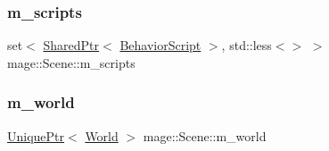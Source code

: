 \subsubsection{\texorpdfstring{m\+\_\+scripts}{m\_scripts}}
{\footnotesize\ttfamily set$<$ \hyperlink{namespacemage_a1e01ae66713838a7a67d30e44c67703e}{Shared\+Ptr}$<$ \hyperlink{classmage_1_1_behavior_script}{Behavior\+Script} $>$, std\+::less$<$$>$ $>$ mage\+::\+Scene\+::m\+\_\+scripts\hspace{0.3cm}{\ttfamily [private]}}

\hypertarget{classmage_1_1_scene_a0d06149d881166497bf75ae2288bf960}{}\label{classmage_1_1_scene_a0d06149d881166497bf75ae2288bf960} 
\subsubsection{\texorpdfstring{m\+\_\+world}{m\_world}}
{\footnotesize\ttfamily \hyperlink{namespacemage_a8c307fbcc33bce9b7f2aa4c26c3b95cf}{Unique\+Ptr}$<$ \hyperlink{classmage_1_1_world}{World} $>$ mage\+::\+Scene\+::m\+\_\+world\hspace{0.3cm}{\ttfamily [private]}}

